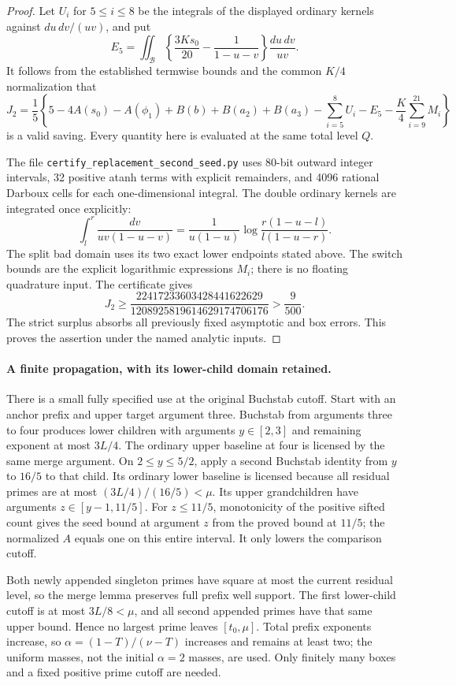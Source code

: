 \begin{proof}
Let $U_i$ for $5\le i\le8$ be the integrals of the displayed ordinary
kernels against $du\,dv/(uv)$, and put
\[
 E_5=\iint_{\mathcal B}
 \left\{\frac{3Ks_0}{20}-\frac1{1-u-v}\right\}\frac{du\,dv}{uv}.
\]
It follows from the established termwise bounds and the common
$K/4$ normalization that
\[
 J_2=\frac15\left\{5-4A(s_0)-A(\phi_1)
       +B(b)+B(a_2)+B(a_3)-\sum_{i=5}^8U_i-E_5
                         -\frac K4\sum_{i=9}^{21}M_i\right\}
\]
is a valid saving.  Every quantity here is evaluated at the same
total level $Q$.

The file \texttt{certify\_replacement\_second\_seed.py} uses 80-bit
outward integer intervals, 32 positive atanh terms with explicit
remainders, and 4096 rational Darboux cells for each one-dimensional
integral.  The double ordinary kernels are integrated once explicitly:
\[
 \int_l^r\frac{dv}{uv(1-u-v)}
  =\frac1{u(1-u)}\log\frac{r(1-u-l)}{l(1-u-r)}.
\]
The split bad domain uses its two exact lower endpoints stated above.
The switch bounds are the explicit logarithmic expressions $M_i$;
there is no floating quadrature input.  The certificate gives
\[
 J_2\ge
 \frac{22417233603428441622629}{1208925819614629174706176}
 >\frac9{500}.
\]
The strict surplus absorbs all previously fixed asymptotic and box
errors.  This proves the assertion under the named analytic inputs.
\end{proof}

\paragraph{A finite propagation, with its lower-child domain retained.}
There is a small fully specified use at the original Buchstab cutoff.
Start with an anchor prefix and upper target argument three.  Buchstab
from arguments three to four produces lower children with arguments
$y\in[2,3]$ and remaining exponent at most $3L/4$.
The ordinary upper baseline at four is licensed by the same merge
argument.  On $2\le y\le5/2$, apply a second Buchstab identity from
$y$ to $16/5$ to that child.  Its ordinary lower baseline is licensed
because all residual primes are at most
$(3L/4)/(16/5)<\mu$.  Its upper grandchildren have arguments
$z\in[y-1,11/5]$.
For $z\le11/5$, monotonicity of the positive sifted count gives the
seed bound at argument $z$ from the proved bound at $11/5$;
the normalized $A$ equals one on this entire interval.
It only lowers the comparison cutoff.

Both newly appended singleton primes have square at most the current
residual level, so the merge lemma preserves full prefix well support.
The first lower-child cutoff is at most $3L/8<\mu$, and all second
appended primes have that same upper bound.  Hence no largest prime
leaves $[t_0,\mu]$.  Total prefix exponents increase, so
$\alpha=(1-T)/(\nu-T)$ increases and remains at least two;
the uniform masses, not the initial $\alpha=2$ masses, are used.
Only finitely many boxes and a fixed positive prime cutoff are needed.

